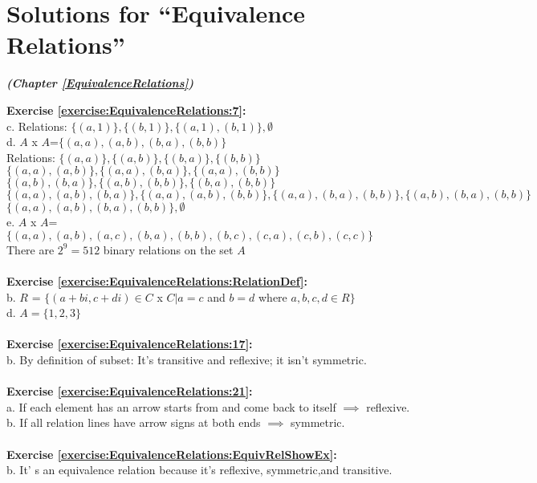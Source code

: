 \section{Solutions for  ``Equivalence Relations''}
\label{sec:AnswerKey:EquivalenceRelations}
\noindent\textbf{\textit{ (Chapter \ref{EquivalenceRelations})}}\bigskip

\noindent\textbf{Exercise \ref{exercise:EquivalenceRelations:7}:}\\
c. Relations: $\{(a,1)\},\{(b,1)\},\{(a,1),(b,1)\},\emptyset$\\
d. $A$ x $A$=$\{(a,a),(a,b),(b,a),(b,b)\}$\\
Relations: $\{(a,a)\},\{(a,b)\}, \{(b,a)\}, \{(b,b)\}$\\
$\{(a,a),(a,b)\}, \{(a,a),(b,a)\}, \{(a,a),(b,b)\}$\\
$\{(a,b),(b,a)\}, \{(a,b),(b,b)\}, \{(b,a),(b,b)\}$\\
$\{(a,a),(a,b),(b,a)\}, \{(a,a),(a,b),(b,b)\}, \{(a,a),(b,a),(b,b)\}, \{(a,b),(b,a),(b,b)\}$\\
$\{(a,a),(a,b),(b,a),(b,b)\},\emptyset$\\
e. $A$ x $A$=$\{(a,a),(a,b),(a,c),(b,a),(b,b),(b,c),(c,a),(c,b),(c,c)\}$\\
There are $2^9=512$ binary relations on the set $A$\\
\\
\textbf{Exercise \ref{exercise:EquivalenceRelations:RelationDef}:}\\
b. $R$ = $\{(a+bi,c+di)\in C$ x $C | a=c$ and $b=d$ where $a,b,c,d\in R\}$\\
d. $A=\{1,2,3\}$\\
\\
\textbf{Exercise \ref{exercise:EquivalenceRelations:17}:}\\
b. By definition of subset: It's transitive and reflexive; it isn't symmetric.\\
\\
\textbf{Exercise \ref{exercise:EquivalenceRelations:21}:}\\
a. If each element has an arrow starts from and come back to itself $\implies$  reflexive.\\
b. If all relation lines have arrow signs at both ends $\implies$  symmetric.\\
\\
\textbf{Exercise \ref{exercise:EquivalenceRelations:EquivRelShowEx}:}\\
b. It' s an equivalence relation because it's reflexive, symmetric,and transitive.\\
